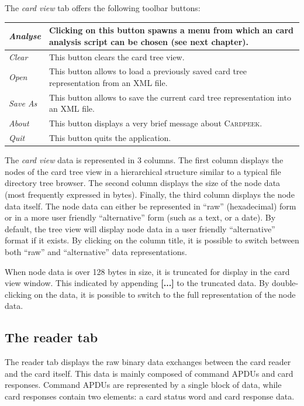 \documentclass[11pt]{report}
\newcommand{\Cardpeek}{\textsc{Cardpeek}}
\begin{document}
The \emph{card view} tab offers the following toolbar buttons:

\vspace{1em}\noindent
\begin{tabular}{l|p{12cm}}
\hline
\emph{Analyse}    & Clicking on this button spawns a menu from which an card analysis script can be chosen (see next chapter). \\  
\hline
\emph{Clear}      & This button clears the card tree view.\\
\hline
\emph{Open}       & This button allows to load a previously saved card tree representation from an XML file.\\
\hline
\emph{Save As}    & This button allows to save the current card tree representation into an XML file. \\
\hline
\emph{About}      & This button displays a very brief message about \Cardpeek. \\
\hline
\emph{Quit}       & This button quits the application. \\
\hline
\end{tabular}
\vspace{2em}

The \emph{card view} data is represented in 3 columns. The first column displays the nodes of the card tree view
in a hierarchical structure similar to a typical file directory tree browser. The second column displays the size
of the node data (most frequently expressed in bytes). Finally, the third column displays the node data itself.
The node data can either be represented in ``raw'' (hexadecimal) form or in a more user friendly ``alternative'' form
(such as a text, or a date).
By default, the tree view will display node data in a user friendly ``alternative'' format if it exists. 
By clicking on the column title, it is possible to switch between both ``raw'' and ``alternative'' data representations.

When node data is over 128 bytes in size, it is truncated for display in the card view window. 
This indicated by appending \textbf{[...]} to the truncated data. By double-clicking on the data, it is possible
to switch to the full representation of the node data.

\subsection{The reader tab}

The reader tab displays the raw binary data exchanges between the card reader and the card itself. 
This data is mainly composed of command APDUs and card responses. Command APDUs are represented by a single
block of data, while card responses contain two elements: a card status word and card response data.
\end{document}
